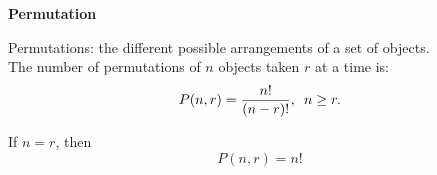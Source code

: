 \begin{center}
\textbf{Permutation
}
\end{center}

\vspace*{1ex}

Permutations: the different possible arrangements of a set of objects. \\ The number of permutations of $n$  objects taken $r$ at a time is:  
\[           P(n, r) = \displaystyle \frac{n!}{(n-r)!}, \hspace{0.5em} n\geq r. \]

\vspce 

If $n=r$, then \[
P(n, r) = n! 
\] 


